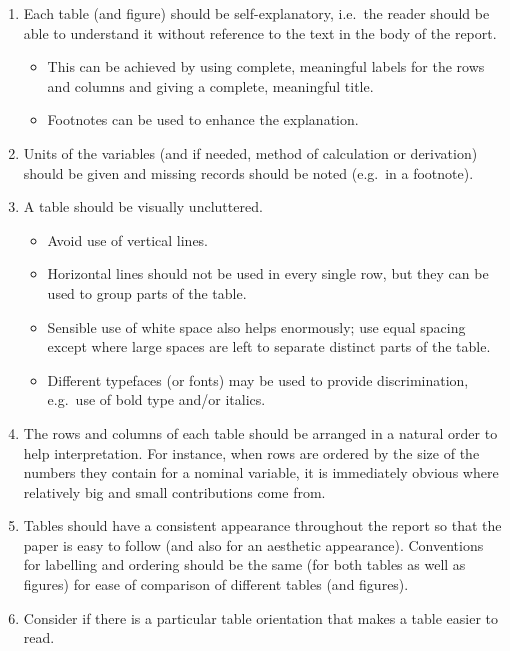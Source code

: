\documentclass[
]{memoir}
\providecommand{\tightlist}{%
  \setlength{\itemsep}{0pt}\setlength{\parskip}{0pt}}
\begin{document}
\begin{enumerate}
\def\labelenumi{\arabic{enumi}.}
\tightlist
\item
  Each table (and figure) should be self-explanatory, i.e.~the reader should be able to understand it without reference to the text in the body of the report.

  \begin{itemize}
  \tightlist
  \item
    This can be achieved by using complete, meaningful labels for the rows and columns and giving a complete, meaningful title.
  \item
    Footnotes can be used to enhance the explanation.
  \end{itemize}
\item
  Units of the variables (and if needed, method of calculation or derivation) should be given and missing records should be noted (e.g.~in a footnote).
\item
  A table should be visually uncluttered.

  \begin{itemize}
  \tightlist
  \item
    Avoid use of vertical lines.
  \item
    Horizontal lines should not be used in every single row, but they can be used to group parts of the table.
  \item
    Sensible use of white space also helps enormously; use equal spacing except where large spaces are left to separate distinct parts of the table.
  \item
    Different typefaces (or fonts) may be used to provide discrimination, e.g.~use of bold type and/or italics.
  \end{itemize}
\item
  The rows and columns of each table should be arranged in a natural order to help interpretation. For instance, when rows are ordered by the size of the numbers they contain for a nominal variable, it is immediately obvious where relatively big and small contributions come from.
\item
  Tables should have a consistent appearance throughout the report so that the paper is easy to follow (and also for an aesthetic appearance). Conventions for labelling and ordering should be the same (for both tables as well as figures) for ease of comparison of different tables (and figures).
\item
  Consider if there is a particular table orientation that makes a table easier to read.
\end{enumerate}
\end{document}
